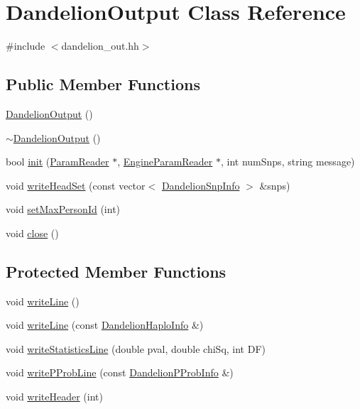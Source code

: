 \hypertarget{classDandelionOutput}{
\section{DandelionOutput Class Reference}
\label{classDandelionOutput}
}


{\ttfamily \#include $<$dandelion\_\-out.hh$>$}

\subsection*{Public Member Functions}
\begin{DoxyCompactItemize}
\item 
\hyperlink{classDandelionOutput_ae562a10e412aea6c27caf8316b31eb99}{DandelionOutput} ()
\item 
\hyperlink{classDandelionOutput_aaf9c5c50d9328fb09f4a982c001f659f}{$\sim$DandelionOutput} ()
\item 
bool \hyperlink{classDandelionOutput_a93338e6f99505f5d261edac17a7199e4}{init} (\hyperlink{classParamReader}{ParamReader} $\ast$, \hyperlink{classEngineParamReader}{EngineParamReader} $\ast$, int numSnps, string message)
\item 
void \hyperlink{classDandelionOutput_a3b4644ac035b093a86e6cf9e45bd2fc3}{writeHeadSet} (const vector$<$ \hyperlink{structDandelionSnpInfo}{DandelionSnpInfo} $>$ \&snps)
\item 
void \hyperlink{classDandelionOutput_aef3d333c031d511dabfff9235b04566d}{setMaxPersonId} (int)
\item 
void \hyperlink{classDandelionOutput_a4688c66f48f4db8c01248707e40ceef2}{close} ()
\end{DoxyCompactItemize}
\subsection*{Protected Member Functions}
\begin{DoxyCompactItemize}
\item 
void \hyperlink{classDandelionOutput_a86c08bdbc0bce02269f0237361cc9d7d}{writeLine} ()
\item 
void \hyperlink{classDandelionOutput_a97207aef1bd36b64aa00710072b2739d}{writeLine} (const \hyperlink{structDandelionHaploInfo}{DandelionHaploInfo} \&)
\item 
void \hyperlink{classDandelionOutput_a156a4bbb16c88aa885fc09e9a7f381c5}{writeStatisticsLine} (double pval, double chiSq, int DF)
\item 
void \hyperlink{classDandelionOutput_a9697f01201040850bafa5ee8b44c5fc5}{writePProbLine} (const \hyperlink{structDandelionPProbInfo}{DandelionPProbInfo} \&)
\item 
void \hyperlink{classDandelionOutput_acff40c7e6f90361aa9a96195039f6016}{writeHeader} (int)
\end{DoxyCompactItemize}
